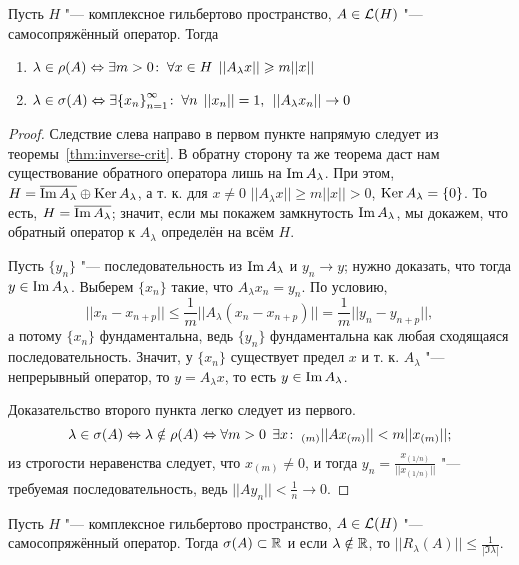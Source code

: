 \documentclass[main]{subfiles}
\begin{document}
\begin{theorem}%
  Пусть \( H \) "--- комплексное гильбертово пространство,
  \( A \in \Linears{H} \) "--- самосопряжённый оператор.
  Тогда
  \begin{enumerate}
    \item \( \lambda \in \rho(A) \Leftrightarrow
      \exists m > 0 \colon \: \forall {x \in H} \; \, ||A_\lambda x|| \geqslant m ||x|| \)
    \item \( \lambda \in \sigma(A) \Leftrightarrow
      \exists  {\{ x_n \}}_{n=1}^\infty  \colon \:
      \forall {n} \; \, ||x_n|| = 1, \: \:
      ||A_\lambda x_n|| \to 0 \)
  \end{enumerate}
\end{theorem}
\begin{proof}
  Следствие слева направо в первом пункте напрямую следует из
  теоремы~\ref{thm:inverse-crit}.
  В обратну сторону та же теорема даст нам существование
  обратного оператора лишь на \( \operatorname{Im} A_\lambda \).
  При  этом,
  \( H = \overline{\operatorname{Im} A_\lambda} \oplus \operatorname{Ker} A_\lambda \),
  а т. к. для \( x \ne 0 \) \( ||A_\lambda x|| \ge m ||x|| > 0 \),
  \( \operatorname{Ker} A_\lambda = \{ 0 \} \).
  То есть, \( H = \overline{\operatorname{Im} A_\lambda} \);
  значит, если мы покажем замкнутость \( \operatorname{Im} A_\lambda \),
  мы докажем, что обратный оператор к \( A_\lambda \)
  определён на всём \( H \).

  Пусть \( \{ y_n \} \) "--- последовательность из
  \( \operatorname{Im} A_\lambda \) и \( y_n \to y \);
  нужно доказать, что тогда \( y \in \operatorname{Im} A_\lambda \).
  Выберем \( \{ x_n \} \) такие, что \( A_\lambda x_n = y_n \).
  По условию,
  \[ ||x_n - x_{n+p}|| \le
    \frac1m ||A_\lambda (x_n - x_{n+p})|| =
    \frac1m ||y_n - y_{n+p}||,
  \]
  а потому \( \{ x_n \} \) фундаментальна,
  ведь \( \{ y_n \} \) фундаментальна
  как любая сходящаяся последовательность.
  Значит, у \( \{ x_n \} \) существует предел \( x \)
  и т. к. \( A_\lambda \) "--- непрерывный оператор, то
  \( y = A_\lambda x \), то есть \( y \in \operatorname{Im} A_\lambda \).

  Доказательство второго пункта легко следует
  из первого.
  \[
    \lambda \in \sigma(A) \Leftrightarrow
    \lambda \notin \rho(A) \Leftrightarrow
    \forall {m > 0} \; \, \exists x \colon \:_{(m)} ||A x_{(m)}|| < m ||x_{(m)}||;
  \]
  из строгости неравенства следует, что
  \( x_{(m)} \ne 0 \), и тогда
  \( y_n = \frac{x_{(1/n)}}{||x_{(1/n)}||} \) "---
  требуемая последовательность,
  ведь \( ||A y_n|| < \frac1n \to 0 \).
\end{proof}

\begin{theorem}%
  Пусть \( H \) "--- комплексное гильбертово пространство,
  \( A \in \Linears{H} \) "--- самосопряжённый оператор.
  Тогда \( \sigma(A) \subset \mathbb{R} \) и
  если \( \lambda \notin \mathbb{R} \), то
  \( ||R_\lambda(A)|| \le \frac{1}{|\Im \lambda|} \).
\end{theorem}
\end{document}
